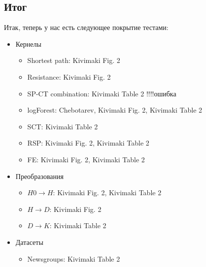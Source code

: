 \documentclass{article}
\begin{document}
\subsection{Итог}
Итак, теперь у нас есть следующее покрытие тестами:
\begin{itemize}
  \item Кернелы
  \begin{itemize}
    \item Shortest path: Kivimaki Fig. 2
    \item Resistance: Kivimaki Fig. 2
    \item SP-CT combination: Kivimaki Table 2 !!!!ошибка
    \item logForest: Chebotarev, Kivimaki Fig. 2, Kivimaki Table 2
    \item SCT: Kivimaki Table 2
    \item RSP: Kivimaki Fig. 2, Kivimaki Table 2
    \item FE: Kivimaki Fig. 2, Kivimaki Table 2
  \end{itemize}
  \item Преобразования
  \begin{itemize}
    \item $H0 \rightarrow H$: Kivimaki Fig. 2, Kivimaki Table 2 
    \item $H \rightarrow D$: Kivimaki Fig. 2
    \item $D \rightarrow K$: Kivimaki Table 2
   \end{itemize}
   \item Датасеты
   \begin{itemize}
     \item Newsgroups: Kivimaki Table 2
   \end{itemize}
\end{itemize}
\end{document}
